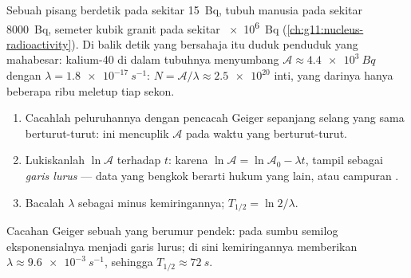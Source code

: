 \begin{example}\label{ex:g12:radioactive-decay:body}
Sebuah pisang berdetik pada sekitar \qty{15}{Bq}, tubuh manusia pada sekitar
\qty{8000}{Bq}, semeter kubik granit pada sekitar \qty{e6}{Bq}
(\cref{ch:g11:nucleus-radioactivity}). Di balik detik yang bersahaja itu duduk
penduduk yang mahabesar: kalium-40 di dalam tubuhnya menyumbang
$\mathcal A \approx \qty{4.4e3}{Bq}$ dengan $\lambda =
\qty{1.8e-17}{s^{-1}}$: $N = \mathcal A/\lambda \approx \num{2.5e20}$
inti, yang darinya hanya beberapa ribu meletup tiap sekon.
\end{example}

\begin{method}\label{met:g12:radioactive-decay:semilog}
\begin{enumerate}
  \item Cacahlah peluruhannya dengan pencacah Geiger sepanjang selang yang sama
        berturut-turut: ini mencuplik $\mathcal A$ pada waktu yang berturut-turut.
  \item Lukiskanlah $\ln \mathcal A$ terhadap $t$: karena
        $\ln \mathcal A = \ln \mathcal A_0 - \lambda t$,  tampil sebagai \emph{garis lurus} --- data yang bengkok berarti
        hukum yang lain, atau campuran .
  \item Bacalah $\lambda$ sebagai minus kemiringannya; $T_{1/2} = \ln 2/\lambda$.
\end{enumerate}
\end{method}

\begin{omfigure}

{\small Cacahan Geiger sebuah  yang berumur pendek: pada sumbu semilog
eksponensialnya menjadi garis lurus; di sini kemiringannya memberikan
$\lambda \approx \qty{9.6e-3}{s^{-1}}$, sehingga $T_{1/2} \approx \qty{72}{s}$.}
\end{omfigure}

